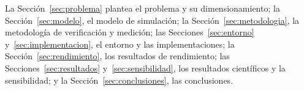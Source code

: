 La Sección~\ref{sec:problema} plantea el problema y su dimensionamiento; la Sección~\ref{sec:modelo}, el modelo de simulación; la Sección~\ref{sec:metodologia}, la metodología de verificación y medición; las Secciones~\ref{sec:entorno} y~\ref{sec:implementacion}, el entorno y las implementaciones; la Sección~\ref{sec:rendimiento}, los resultados de rendimiento; las Secciones~\ref{sec:resultados} y~\ref{sec:sensibilidad}, los resultados científicos y la sensibilidad; y la Sección~\ref{sec:conclusiones}, las conclusiones.
